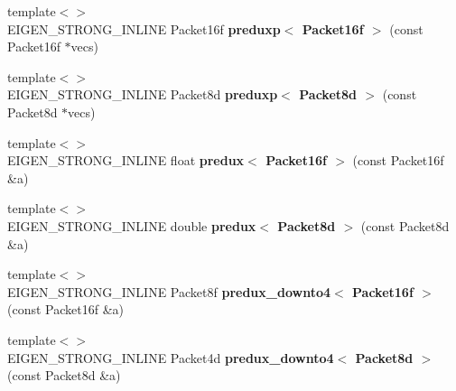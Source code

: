 \begin{DoxyCompactItemize}
\item 
\mbox{\label{namespace_eigen_1_1internal_a59c75851a19d41f2e8a417193502fb7c}} 
{\footnotesize template$<$$>$ }\\E\+I\+G\+E\+N\+\_\+\+S\+T\+R\+O\+N\+G\+\_\+\+I\+N\+L\+I\+NE Packet16f {\bfseries preduxp$<$ Packet16f $>$} (const Packet16f $\ast$vecs)
\item 
\mbox{\label{namespace_eigen_1_1internal_a399f82ea79fea2221d7f16914f1a08e2}} 
{\footnotesize template$<$$>$ }\\E\+I\+G\+E\+N\+\_\+\+S\+T\+R\+O\+N\+G\+\_\+\+I\+N\+L\+I\+NE Packet8d {\bfseries preduxp$<$ Packet8d $>$} (const Packet8d $\ast$vecs)
\item 
\mbox{\label{namespace_eigen_1_1internal_a73901a0d1d0c5b8b6f0eb4cfa83e68e0}} 
{\footnotesize template$<$$>$ }\\E\+I\+G\+E\+N\+\_\+\+S\+T\+R\+O\+N\+G\+\_\+\+I\+N\+L\+I\+NE float {\bfseries predux$<$ Packet16f $>$} (const Packet16f \&a)
\item 
\mbox{\label{namespace_eigen_1_1internal_a6da413a921f49aa16dc5734f7e95ebd2}} 
{\footnotesize template$<$$>$ }\\E\+I\+G\+E\+N\+\_\+\+S\+T\+R\+O\+N\+G\+\_\+\+I\+N\+L\+I\+NE double {\bfseries predux$<$ Packet8d $>$} (const Packet8d \&a)
\item 
\mbox{\label{namespace_eigen_1_1internal_a1943fd708af37d50c00c60b4e96fa8b0}} 
{\footnotesize template$<$$>$ }\\E\+I\+G\+E\+N\+\_\+\+S\+T\+R\+O\+N\+G\+\_\+\+I\+N\+L\+I\+NE Packet8f {\bfseries predux\+\_\+downto4$<$ Packet16f $>$} (const Packet16f \&a)
\item 
\mbox{\label{namespace_eigen_1_1internal_a881c33f667c9001f90151c91a9cf9021}} 
{\footnotesize template$<$$>$ }\\E\+I\+G\+E\+N\+\_\+\+S\+T\+R\+O\+N\+G\+\_\+\+I\+N\+L\+I\+NE Packet4d {\bfseries predux\+\_\+downto4$<$ Packet8d $>$} (const Packet8d \&a)
\item 
\mbox{\label{namespace_eigen_1_1internal_a6b3a7bccf8209931f7f588c878c2406a}} 

\end{DoxyCompactItemize}
